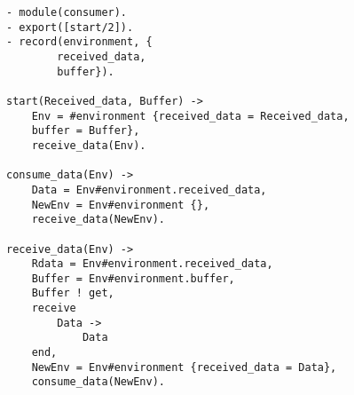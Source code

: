 \begin{verbatim}
- module(consumer).
- export([start/2]).
- record(environment, {
        received_data,
        buffer}).

start(Received_data, Buffer) -> 
    Env = #environment {received_data = Received_data,
    buffer = Buffer},
    receive_data(Env).

consume_data(Env) -> 
    Data = Env#environment.received_data,
    NewEnv = Env#environment {},
    receive_data(NewEnv).

receive_data(Env) -> 
    Rdata = Env#environment.received_data,
    Buffer = Env#environment.buffer,
    Buffer ! get,
    receive 
        Data -> 
            Data
    end,
    NewEnv = Env#environment {received_data = Data},
    consume_data(NewEnv).
\end{verbatim}
